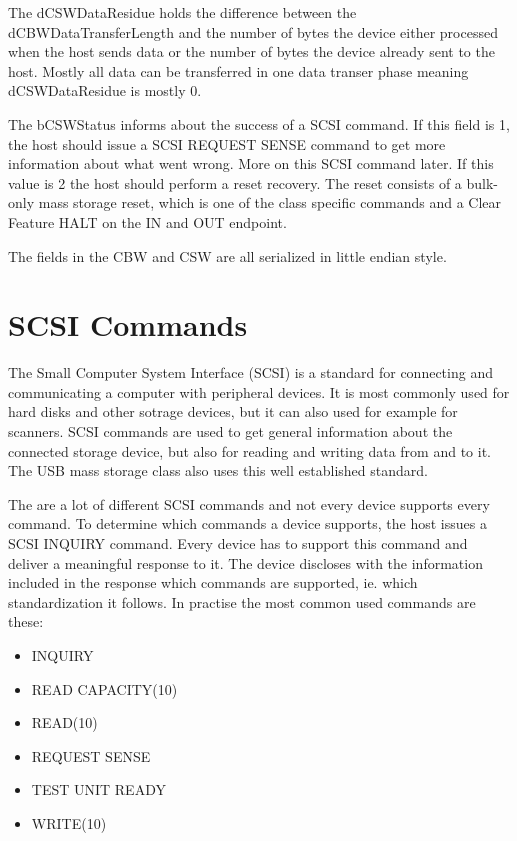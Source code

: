 The dCSWDataResidue holds the difference between the dCBWDataTransferLength and the number of bytes the device either processed when the host sends data or the number of bytes the device already sent to the host. Mostly all data can be transferred in one data transer phase meaning dCSWDataResidue is mostly 0.

The bCSWStatus informs about the success of a SCSI command. If this field is 1, the host should issue a SCSI REQUEST SENSE command to get more information about what went wrong\cite{usb_ms_jan}. More on this SCSI command later. If this value is 2 the host should perform a reset recovery. The reset consists of a bulk-only mass storage reset, which is one of the class specific commands and a Clear Feature HALT on the IN and OUT endpoint\cite{usb_ms_jan, usb_mass_bulk}.

The fields in the CBW and CSW are all serialized in little endian style.

\section{SCSI Commands}

The Small Computer System Interface (SCSI) is a standard for connecting and communicating a computer with peripheral devices. It is most commonly used for hard disks and other sotrage devices, but it can also used for example for scanners\cite{wiki_scsi}. SCSI commands are used to get general information about the connected storage device, but also for reading and writing data from and to it. The USB mass storage class also uses this well established standard.

The are a lot of different SCSI commands and not every device supports every command. To determine which commands a device supports, the host issues a SCSI INQUIRY command. Every device has to support this command and deliver a meaningful response to it. The device discloses with the information included in the response which commands are supported, ie. which standardization it follows. In practise the most common used commands are these\cite{usb_ms_jan}:

\begin{itemize}
\item INQUIRY
\item READ CAPACITY(10)
\item READ(10)
\item REQUEST SENSE
\item TEST UNIT READY
\item WRITE(10)
\end{itemize}

